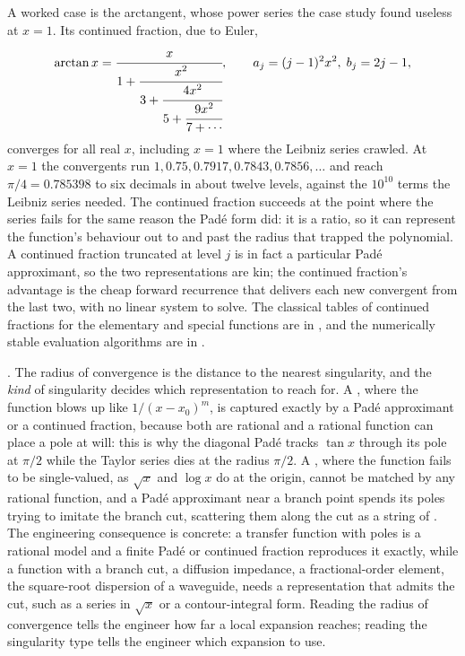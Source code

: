 A worked case is the arctangent, whose power series the case study found
useless at $x = 1$. Its continued fraction, due to Euler,
\[
\arctan x = \cfrac{x}{1 + \cfrac{x^{2}}{3 + \cfrac{4 x^{2}}{5 +
\cfrac{9 x^{2}}{7 + \cdots}}}}, \qquad a_{j} = (j-1)^{2} x^{2},\;
b_{j} = 2j - 1,
\]
converges for all real $x$, including $x = 1$ where the Leibniz series
crawled. At $x = 1$ the convergents run $1, 0.75, 0.7917, 0.7843,
0.7856, \ldots$ and reach $\pi/4 = 0.785398$ to six decimals in about
twelve levels, against the $10^{10}$ terms the Leibniz series needed.
The continued fraction succeeds at the point where the series fails for
the same reason the Pad\'{e} form did: it is a ratio, so it can
represent the function's behaviour out to and past the radius that
trapped the polynomial. A continued fraction truncated at level $j$ is
in fact a particular Pad\'{e} approximant, so the two representations
are kin; the continued fraction's advantage is the cheap forward
recurrence that delivers each new convergent from the last two, with no
linear system to solve. The classical tables of continued fractions for
the elementary and special functions are in
\cite{text:v2ch04-abramowitz-stegun-1972}, and the numerically stable
evaluation algorithms are in
\cite{text:v2ch04-bender-orszag-1999}.

\begin{mastery}
. The radius of convergence is the distance to the nearest
singularity, and the \emph{kind} of singularity decides which
representation to reach for. A , where the function blows
up like $1/(x - x_{0})^{m}$, is captured exactly by a Pad\'{e}
approximant or a continued fraction, because both are rational and a
rational function can place a pole at will: this is why the diagonal
Pad\'{e} tracks $\tan x$ through its pole at $\pi/2$ while the Taylor
series dies at the radius $\pi/2$. A , where the
function fails to be single-valued, as $\sqrt{x}$ and $\log x$ do at
the origin, cannot be matched by any rational function, and a Pad\'{e}
approximant near a branch point spends its poles trying to imitate the
branch cut, scattering them along the cut as a string of
. The engineering consequence is concrete:
a transfer function with poles is a rational model and a finite Pad\'{e}
or continued fraction reproduces it exactly, while a function with a
branch cut, a diffusion impedance, a fractional-order element, the
square-root dispersion of a waveguide, needs a representation that
admits the cut, such as a series in $\sqrt{x}$ or a contour-integral
form. Reading the radius of convergence tells the engineer how far a
local expansion reaches; reading the singularity type tells the engineer
which expansion to use.
\end{mastery}

